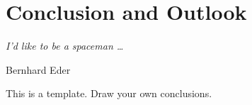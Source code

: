\chapter{Conclusion and Outlook}

\epigraph{
	{\large\eighthnote \raisebox{0.3ex}{\twonotes}}\textit{I'd like to be a spaceman \dots} {\large\quarternote}
}{Bernhard Eder}


This is a template. Draw your own conclusions.
